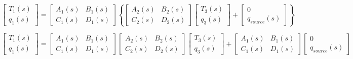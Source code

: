 \begin{equation}
\left[ {\begin{array}{*{20}{c}}{{T_1}\left( s \right)}\\ {{q_1}\left( s \right)}\end{array}} \right] = \left[ {\begin{array}{*{20}{c}}{{A_1}\left( s \right)}&{{B_1}\left( s \right)}\\ {{C_1}\left( s \right)}&{{D_1}\left( s \right)}\end{array}} \right]\left\{ {\left[ {\begin{array}{*{20}{c}}{{A_2}\left( s \right)}&{{B_2}\left( s \right)}\\ {{C_2}\left( s \right)}&{{D_2}\left( s \right)}\end{array}} \right]\left[ {\begin{array}{*{20}{c}}{{T_3}\left( s \right)}\\ {{q_3}\left( s \right)}\end{array}} \right] + \left[ {\begin{array}{*{20}{c}}0\\ {{q_{source}}\left( s \right)}\end{array}} \right]} \right\}
\end{equation}

\begin{equation}
\left[ {\begin{array}{*{20}{c}}{{T_1}\left( s \right)}\\ {{q_1}\left( s \right)}\end{array}} \right] = \left[ {\begin{array}{*{20}{c}}{{A_1}\left( s \right)}&{{B_1}\left( s \right)}\\ {{C_1}\left( s \right)}&{{D_1}\left( s \right)}\end{array}} \right]\left[ {\begin{array}{*{20}{c}}{{A_2}\left( s \right)}&{{B_2}\left( s \right)}\\ {{C_2}\left( s \right)}&{{D_2}\left( s \right)}\end{array}} \right]\left[ {\begin{array}{*{20}{c}}{{T_3}\left( s \right)}\\ {{q_3}\left( s \right)}\end{array}} \right] + \left[ {\begin{array}{*{20}{c}}{{A_1}\left( s \right)}&{{B_1}\left( s \right)}\\ {{C_1}\left( s \right)}&{{D_1}\left( s \right)}\end{array}} \right]\left[ {\begin{array}{*{20}{c}}0\\ {{q_{source}}\left( s \right)}\end{array}} \right]
\label{eq:TwoLayerEquivalentQTFLaplaceForm}
\end{equation}

